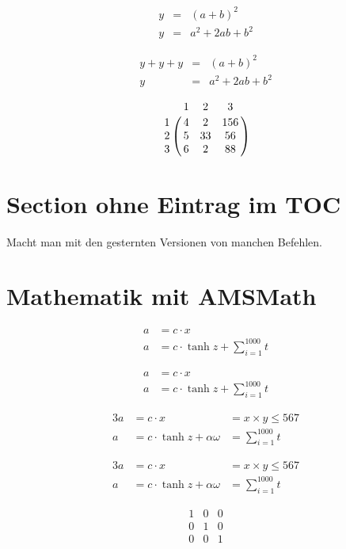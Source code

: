 \begin{eqnarray*} %
y &=& (a + b)^2 \\
y &=& a^2 + 2ab +b^2 
\end{eqnarray*}

\blindtext

\[
\begin{array}{lcr}
y + y + y &=& (a + b)^2 \\
y &=& a^2 + 2ab +b^2 
\end{array}
\]

\[ %
\bordermatrix{
   & 1 & 2 & 3 \cr
1 & 4 & 2 & 156 \cr
2 & 5 & 33 & 56 \cr
3 & 6 & 2 & 88 \cr
}
\]

\section*{Section ohne Eintrag im TOC}

Macht man mit den gesternten Versionen von manchen Befehlen.

\section{Mathematik mit AMSMath}

\begin{align} %
a &= c \cdot x \\
a &= c \cdot \tanh z + \sum_{i=1}^{1000} t
\end{align}

\begin{align*} %
a &= c \cdot x \\
a &= c \cdot \tanh z + \sum_{i=1}^{1000} t
\end{align*}

\begin{alignat}{3}
a &= c \cdot x &= x\times y \leq 567 \\
a &= c \cdot \tanh z + \alpha\omega &= \sum_{i=1}^{1000} t
\end{alignat}

\begin{alignat*}{3}
a &= c \cdot x &= x\times y \leq 567 \\
a &= c \cdot \tanh z + \alpha\omega &= \sum_{i=1}^{1000} t
\end{alignat*}

\[%
\begin{matrix} 
1 & 0 & 0 \\ 
0 & 1 & 0 \\ 
0 & 0 & 1 \\ 
\end{matrix}
\]


